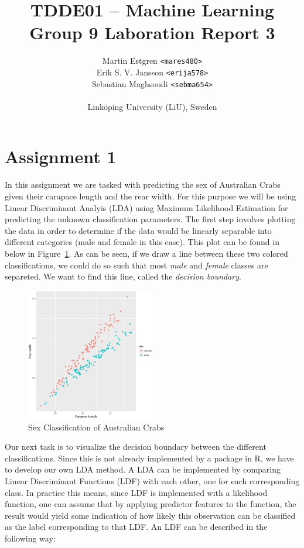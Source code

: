 \documentclass[a4paper, twocolumn]{article}
\title{TDDE01 -- Machine Learning \\
       Group 9 Laboration Report 3}
\author{{Martin Estgren \texttt{<mares480>}} \\
        {Erik S. V. Jansson \texttt{<erija578>}} \\
        {Sebastian Maghsoudi \texttt{<sebma654>}} \\~\\
        {Linköping University (LiU), Sweden}}
\begin{document}
    \maketitle %

    \section*{Assignment 1}

        In this assignment we are tasked with predicting the sex of Australian Crabs given their carapace length and the rear width. For this purpose we will be using
        Linear Discriminant Analyis (LDA) using Maximum Likelihood Estimation for predicting the unknown classification parameters. The first step involves plotting the
        data in order to determine if the data would be linearly separable into different categories (male and female in this case). This plot can be found in below in
        Figure~\ref{fig:crabs}. As can be seen, if we draw a line between these two colored classifications, we could do so such that most \emph{male} and \emph{female}
        classes are separeted. We want to find this line, called the \emph{decision boundary}.

        \begin{figure}[h!]
          \centering
          \caption{Sex Classification of Australian Crabs}
          \label{fig:crabs}
          \includegraphics[width=0.5\textwidth]{share/crabs.eps}
        \end{figure}

        Our next task is to visualize the decision boundary between the different classifications. Since this is not already implemented by a package in R, we have to
        develop our own LDA method. A LDA can be implemented by comparing Linear Discriminant Functions (LDF) with each other, one for each corresponding class. In practice
        this means, since LDF is implemented with a likelihood function, one can assume that by applying predictor features to the function, the result would yield some indication
        of how likely this observation can be classified as the label corresponding to that LDF. An LDF can be described in the following way:
\end{document}
